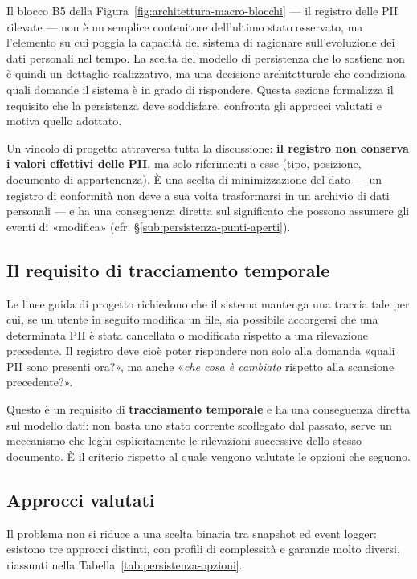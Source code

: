 Il blocco B5 della Figura~\ref{fig:architettura-macro-blocchi} --- il registro delle PII rilevate --- non è un semplice contenitore dell'ultimo stato osservato, ma l'elemento su cui poggia la capacità del sistema di ragionare sull'evoluzione dei dati personali nel tempo. La scelta del modello di persistenza che lo sostiene non è quindi un dettaglio realizzativo, ma una decisione architetturale che condiziona quali domande il sistema è in grado di rispondere. Questa sezione formalizza il requisito che la persistenza deve soddisfare, confronta gli approcci valutati e motiva quello adottato.

Un vincolo di progetto attraversa tutta la discussione: \textbf{il registro non conserva i valori effettivi delle PII}, ma solo riferimenti a esse (tipo, posizione, documento di appartenenza). È una scelta di minimizzazione del dato --- un registro di conformità non deve a sua volta trasformarsi in un archivio di dati personali --- e ha una conseguenza diretta sul significato che possono assumere gli eventi di «modifica» (cfr. §\ref{sub:persistenza-punti-aperti}).

\subsection{Il requisito di tracciamento temporale}
\label{sub:persistenza-requisito}

Le linee guida di progetto richiedono che il sistema mantenga una traccia tale per cui, se un utente in seguito modifica un file, sia possibile accorgersi che una determinata PII è stata cancellata o modificata rispetto a una rilevazione precedente. Il registro deve cioè poter rispondere non solo alla domanda «quali PII sono presenti ora?», ma anche «\textit{che cosa è cambiato} rispetto alla scansione precedente?».

Questo è un requisito di \textbf{tracciamento temporale} e ha una conseguenza diretta sul modello dati: non basta uno stato corrente scollegato dal passato, serve un meccanismo che leghi esplicitamente le rilevazioni successive dello stesso documento. È il criterio rispetto al quale vengono valutate le opzioni che seguono.

\subsection{Approcci valutati}
\label{sub:persistenza-approcci}

Il problema non si riduce a una scelta binaria tra snapshot ed event logger: esistono tre approcci distinti, con profili di complessità e garanzie molto diversi, riassunti nella Tabella~\ref{tab:persistenza-opzioni}.

